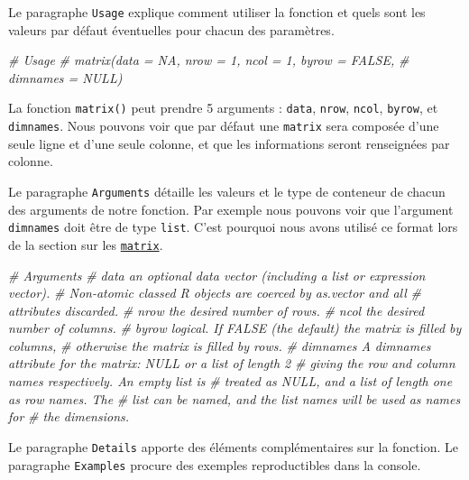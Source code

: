 \documentclass[
]{book}
\newenvironment{Shaded}{\begin{snugshade}}{\end{snugshade}}
\newcommand{\CommentTok}[1]{\textcolor[rgb]{0.56,0.35,0.01}{\textit{#1}}}
\begin{document}
Le paragraphe \texttt{Usage} explique comment utiliser la fonction et quels sont les valeurs par défaut éventuelles pour chacun des paramètres.

\begin{Shaded}
\begin{Highlighting}[]
\CommentTok{# Usage}
\CommentTok{# matrix(data = NA, nrow = 1, ncol = 1, byrow = FALSE,}
\CommentTok{#        dimnames = NULL)}
\end{Highlighting}
\end{Shaded}

La fonction \texttt{matrix()} peut prendre 5 arguments : \texttt{data}, \texttt{nrow}, \texttt{ncol}, \texttt{byrow}, et \texttt{dimnames}. Nous pouvons voir que par défaut une \texttt{matrix} sera composée d'une seule ligne et d'une seule colonne, et que les informations seront renseignées par colonne.

Le paragraphe \texttt{Arguments} détaille les valeurs et le type de conteneur de chacun des arguments de notre fonction. Par exemple nous pouvons voir que l'argument \texttt{dimnames} doit être de type \texttt{list}. C'est pourquoi nous avons utilisé ce format lors de la section sur les \protect\hyperlink{l014matrix}{\texttt{matrix}}.

\begin{Shaded}
\begin{Highlighting}[]
\CommentTok{# Arguments}
\CommentTok{# data      an optional data vector (including a list or expression vector). }
\CommentTok{#           Non-atomic classed R objects are coerced by as.vector and all }
\CommentTok{#           attributes discarded.}
\CommentTok{# nrow      the desired number of rows.}
\CommentTok{# ncol      the desired number of columns.}
\CommentTok{# byrow     logical. If FALSE (the default) the matrix is filled by columns, }
\CommentTok{#           otherwise the matrix is filled by rows.}
\CommentTok{# dimnames  A dimnames attribute for the matrix: NULL or a list of length 2 }
\CommentTok{#           giving the row and column names respectively. An empty list is }
\CommentTok{#           treated as NULL, and a list of length one as row names. The }
\CommentTok{#           list can be named, and the list names will be used as names for }
\CommentTok{#           the dimensions.}
\end{Highlighting}
\end{Shaded}

Le paragraphe \texttt{Details} apporte des éléments complémentaires sur la fonction. Le paragraphe \texttt{Examples} procure des exemples reproductibles dans la console.
\end{document}
